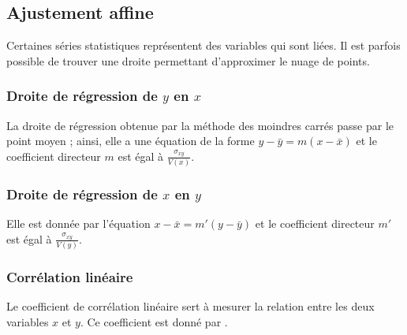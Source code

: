             \subsection{Ajustement affine}%
	                  Certaines s\'eries statistiques repr\'esentent des variables qui sont li\'ees.
                  Il est parfois possible de trouver une droite permettant d'approximer le nuage de points.
                  \subsubsection{Droite de r\'egression de $y$ en $x$}
	                        La droite de r\'egression obtenue par la m\'ethode des moindres carr\'es passe par le point moyen ;
                        ainsi, elle a une \'equation de la forme $y - \bar{y} = m (x - \bar{x})$ et le coefficient
                        directeur $m$ est \'egal \`a $\frac{\sigma_{xy}}{V(x)}$.
                  \subsubsection{Droite de r\'egression de $x$ en $y$}
                        Elle est donn\'ee par l'\'equation $x - \bar{x} = m' (y - \bar{y})$ et le coefficient
                        directeur $m'$ est \'egal \`a $\frac{\sigma_{xy}}{V(y)}$.
                  \subsubsection{Corr\'elation lin\'eaire}
                        Le coefficient de corr\'elation lin\'eaire sert \`a mesurer la relation entre les deux variables
                        $x$ et $y$.
                        Ce coefficient est donn\'e par .
